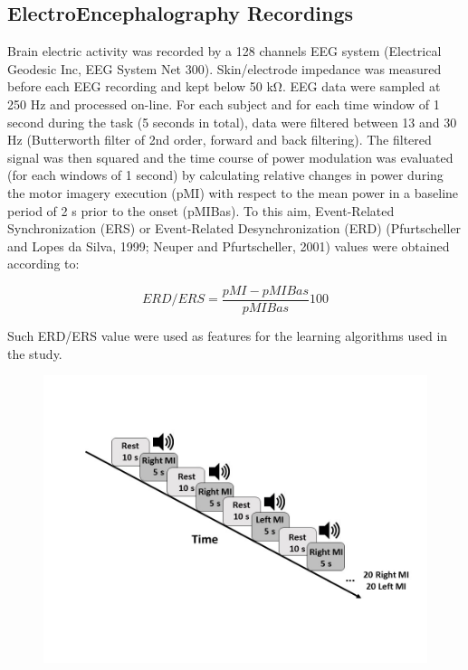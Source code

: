 \documentclass[12pt ]{iopart}
\begin{document}
\subsection{ElectroEncephalography Recordings}
Brain electric activity was recorded by a 128 channels EEG system (Electrical Geodesic Inc, EEG System Net 300).
Skin/electrode impedance was measured before each EEG recording and kept below 50 kΩ. EEG data were sampled at 250 Hz and processed on-line. For each subject and for each time window of 1 second during the task (5 seconds in total), data were filtered between 13 and 30 Hz (Butterworth filter of 2nd order, forward and back filtering). The filtered signal was then squared
and the time course of power modulation was evaluated (for each windows of 1 second) by calculating relative changes in power during the motor imagery execution (pMI) with respect to the mean power in a baseline period of 2 s prior to the onset (pMIBas). To this aim, Event-Related Synchronization (ERS) or Event-Related Desynchronization (ERD) (Pfurtscheller and Lopes da Silva, 1999; Neuper and Pfurtscheller, 2001) values were obtained according to:

\begin{equation}
\label{eqn:erders}
ERD/ERS=\frac{pMI-pMIBas}{pMIBas}100
\end{equation} 

Such ERD/ERS value were used as features for the learning algorithms used in the study. 
 

\begin{figure}
	\includegraphics[width=\linewidth]{Diapositiva2.JPG}
	\caption{}
	\label{fig:fig2}
\end{figure}
\end{document}
